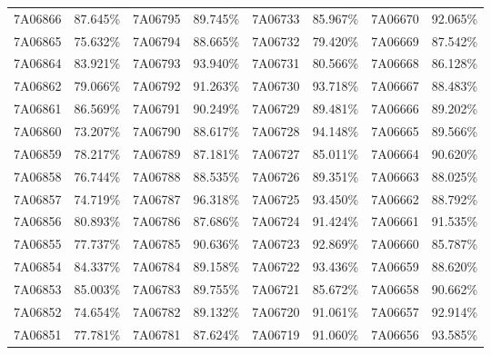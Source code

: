 \documentclass[12pt]{article}%
\begin{document}
\begin{longtable}{|cc|cc|cc|cc|}
7A06866              & 87.645\% & 7A06795              & 89.745\% & 7A06733              & 85.967\% & 7A06670              & 92.065\% \\
7A06865              & 75.632\% & 7A06794              & 88.665\% & 7A06732              & 79.420\% & 7A06669              & 87.542\% \\
7A06864              & 83.921\% & 7A06793              & 93.940\% & 7A06731              & 80.566\% & 7A06668              & 86.128\% \\
7A06862              & 79.066\% & 7A06792              & 91.263\% & 7A06730              & 93.718\% & 7A06667              & 88.483\% \\
7A06861              & 86.569\% & 7A06791              & 90.249\% & 7A06729              & 89.481\% & 7A06666              & 89.202\% \\
7A06860              & 73.207\% & 7A06790              & 88.617\% & 7A06728              & 94.148\% & 7A06665              & 89.566\% \\
7A06859              & 78.217\% & 7A06789              & 87.181\% & 7A06727              & 85.011\% & 7A06664              & 90.620\% \\
7A06858              & 76.744\% & 7A06788              & 88.535\% & 7A06726              & 89.351\% & 7A06663              & 88.025\% \\
7A06857              & 74.719\% & 7A06787              & 96.318\% & 7A06725              & 93.450\% & 7A06662              & 88.792\% \\
7A06856              & 80.893\% & 7A06786              & 87.686\% & 7A06724              & 91.424\% & 7A06661              & 91.535\% \\
7A06855              & 77.737\% & 7A06785              & 90.636\% & 7A06723              & 92.869\% & 7A06660              & 85.787\% \\
7A06854              & 84.337\% & 7A06784              & 89.158\% & 7A06722              & 93.436\% & 7A06659              & 88.620\% \\
7A06853              & 85.003\% & 7A06783              & 89.755\% & 7A06721              & 85.672\% & 7A06658              & 90.662\% \\
7A06852              & 74.654\% & 7A06782              & 89.132\% & 7A06720              & 91.061\% & 7A06657              & 92.914\% \\
7A06851              & 77.781\% & 7A06781              & 87.624\% & 7A06719              & 91.060\% & 7A06656              & 93.585\% \\

\end{longtable}
\end{document}
